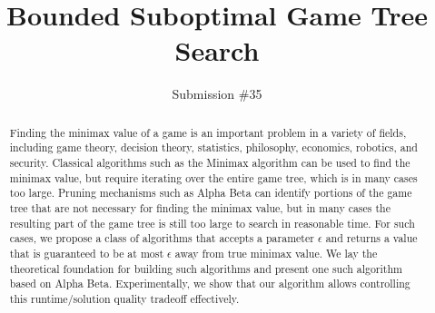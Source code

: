 \documentclass[letterpaper]{article} %
\begin{document}
\title{Bounded Suboptimal Game Tree Search}
\author{Submission \#35}

\maketitle

\begin{abstract}
Finding the minimax value of a game is an important problem in a variety of fields, including game theory, decision theory,  statistics, philosophy, economics, robotics, and security. Classical algorithms such as the Minimax algorithm can be used to find the minimax value, but require iterating over the entire game tree, which is in many cases too large. Pruning mechanisms such as Alpha Beta can identify portions of the game tree that are not necessary for finding the minimax value, but in many cases the resulting part of the game tree is still too large to search in reasonable time. %
For such cases, we propose a class of algorithms that accepts a parameter $\epsilon$ and returns a value that is guaranteed to be at most $\epsilon$ away from true minimax value. We lay the theoretical foundation for building such algorithms and present one such algorithm based on Alpha Beta. Experimentally, we show that our  algorithm allows controlling this runtime/solution quality tradeoff effectively. %




\end{abstract}
\end{document}
